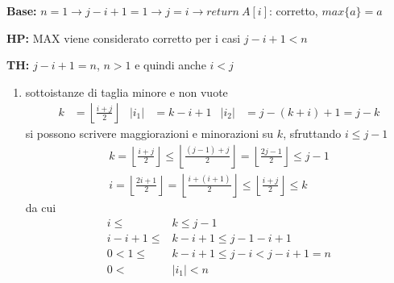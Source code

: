\begin{description}
    \item{\textbf{Base:}} $n=1 \rightarrow j-i+1=1 \rightarrow j=i \rightarrow return \: A[i]$: corretto, $max\{a\}=a$
    \item{\textbf{HP:}} MAX viene considerato corretto per i casi $j-i+1 < n$
    \item{\textbf{TH:}} $j-i+1 = n$, $n>1$ e quindi anche $i<j$
        \begin{enumerate}[noitemsep,topsep=0pt,parsep=0pt,partopsep=0pt]
            \item sottoistanze di taglia minore e non vuote
                \begin{align*}
                    k&= \left\lfloor \frac{i+j}{2}\right\rfloor & |i_1| &= k-i+1  & |i_2| &= j-(k+i)+1 = j-k
                \end{align*}
                si possono scrivere maggiorazioni e minorazioni su $k$, sfruttando $i \leq j-1$
                    \begin{gather*}
                        k= \left\lfloor \frac{i+j}{2}\right\rfloor \leq
                        \left\lfloor \frac{(j-1)+j}{2}\right\rfloor = 
                        \left\lfloor \frac{2j-1}{2}\right\rfloor \leq j-1 \\
                        i= \left\lfloor \frac{2i+1}{2}\right\rfloor
                        = \left\lfloor \frac{i+(i+1)}{2}\right\rfloor 
                        \leq \left\lfloor \frac{i+j}{2}\right\rfloor 
                        \leq k
                    \end{gather*}
                da cui 
                \begin{equation*}
                    \begin{split}
                    i \leq &k \leq j-1 \\
                    i-i+1 \leq &k-i+1 \leq j-1-i+1 \\
                    0 < 1 \leq &k-i+1 \leq j-i < j-i+1 = n\\
                    0 < &|i_1| < n

\end{split}
\end{equation*}
\end{enumerate}
\end{description}

